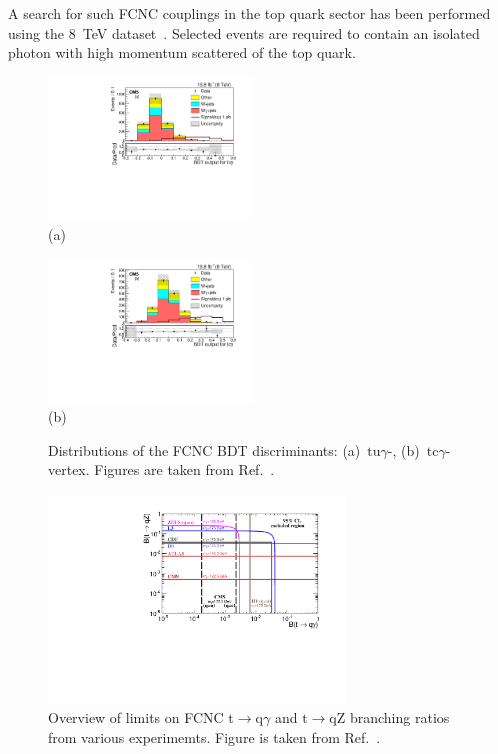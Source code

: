 \documentclass{PoS}
\begin{document}
A search for such FCNC couplings in the top quark sector has been performed using the 8~TeV dataset~\cite{CMS-PAS-TOP-14-003}. Selected events are required to contain an isolated photon with high momentum scattered of the top quark.

\begin{figure}[htbp]
\begin{center}
\parbox[t]{0.49\textwidth}{\centering\includegraphics[width=0.48\textwidth]{figures/FCNC/BDT_utg.pdf}\\(a)}
\parbox[t]{0.49\textwidth}{\centering\includegraphics[width=0.48\textwidth]{figures/FCNC/BDT_ctg.pdf}\\(b)}
\caption{Distributions of the FCNC BDT discriminants: (a)~$\mathrm{tu}\gamma$-, (b)~$\mathrm{tc}\gamma$-vertex. Figures are taken from Ref.~\cite{CMS-PAS-TOP-14-003}.}
\end{center}
\end{figure}

\begin{figure}[htbp]
\begin{center}
\includegraphics[width=0.7\textwidth]{figures/limits.pdf}
\caption{Overview of limits on FCNC $\mathrm{t}\to\mathrm{q}\gamma$ and $\mathrm{t}\to\mathrm{qZ}$ branching ratios from various experimemts. Figure is taken from Ref.~\cite{CMS-PAS-TOP-14-003}.}
\end{center}
\end{figure}
\end{document}
